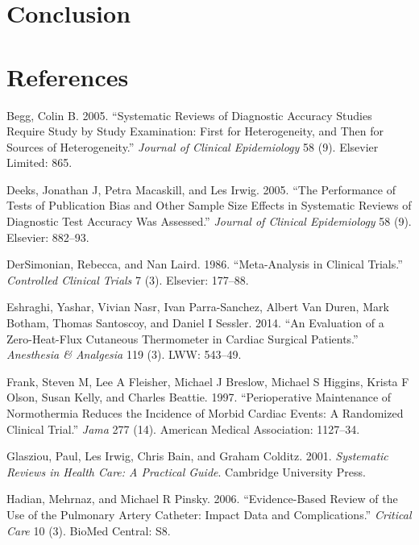 \documentclass[smallextended]{svjour3}       %
\begin{document}
\hypertarget{conclusion}{%
\section{Conclusion}\label{conclusion}}

\hypertarget{references}{%
\section*{References}\label{references}}

\hypertarget{refs}{}
\leavevmode\hypertarget{ref-begg2005systematic}{}%
Begg, Colin B. 2005. ``Systematic Reviews of Diagnostic Accuracy Studies
Require Study by Study Examination: First for Heterogeneity, and Then
for Sources of Heterogeneity.'' \emph{Journal of Clinical Epidemiology}
58 (9). Elsevier Limited: 865.

\leavevmode\hypertarget{ref-deeks2005performance}{}%
Deeks, Jonathan J, Petra Macaskill, and Les Irwig. 2005. ``The
Performance of Tests of Publication Bias and Other Sample Size Effects
in Systematic Reviews of Diagnostic Test Accuracy Was Assessed.''
\emph{Journal of Clinical Epidemiology} 58 (9). Elsevier: 882--93.

\leavevmode\hypertarget{ref-dersimonian1986meta}{}%
DerSimonian, Rebecca, and Nan Laird. 1986. ``Meta-Analysis in Clinical
Trials.'' \emph{Controlled Clinical Trials} 7 (3). Elsevier: 177--88.

\leavevmode\hypertarget{ref-eshraghi2014}{}%
Eshraghi, Yashar, Vivian Nasr, Ivan Parra-Sanchez, Albert Van Duren,
Mark Botham, Thomas Santoscoy, and Daniel I Sessler. 2014. ``An
Evaluation of a Zero-Heat-Flux Cutaneous Thermometer in Cardiac Surgical
Patients.'' \emph{Anesthesia \& Analgesia} 119 (3). LWW: 543--49.

\leavevmode\hypertarget{ref-frank1997perioperative}{}%
Frank, Steven M, Lee A Fleisher, Michael J Breslow, Michael S Higgins,
Krista F Olson, Susan Kelly, and Charles Beattie. 1997. ``Perioperative
Maintenance of Normothermia Reduces the Incidence of Morbid Cardiac
Events: A Randomized Clinical Trial.'' \emph{Jama} 277 (14). American
Medical Association: 1127--34.

\leavevmode\hypertarget{ref-glasziou2001systematic}{}%
Glasziou, Paul, Les Irwig, Chris Bain, and Graham Colditz. 2001.
\emph{Systematic Reviews in Health Care: A Practical Guide}. Cambridge
University Press.

\leavevmode\hypertarget{ref-hadian2006evidence}{}%
Hadian, Mehrnaz, and Michael R Pinsky. 2006. ``Evidence-Based Review of
the Use of the Pulmonary Artery Catheter: Impact Data and
Complications.'' \emph{Critical Care} 10 (3). BioMed Central: S8.
\end{document}
